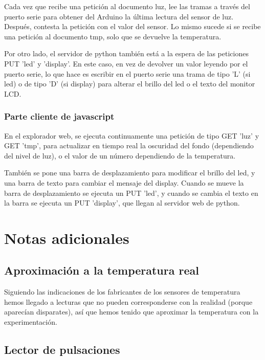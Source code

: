 \documentclass[]{article}
\begin{document}
Cada vez que recibe una petición al documento luz, lee las tramas a través del puerto serie para obtener del Arduino la última lectura del sensor de luz. Después, contesta la petición con el valor del sensor. Lo mismo sucede si se recibe una petición al documento tmp, solo que se devuelve la temperatura.

\hfill

Por otro lado, el servidor de python también está a la espera de las peticiones PUT 'led' y 'display'. En este caso, en vez de devolver un valor leyendo por el puerto serie, lo que hace es escribir en el puerto serie una trama de tipo 'L' (si led) o de tipo 'D' (si display) para alterar el brillo del led o el texto del monitor LCD.

\subsubsection{Parte cliente de javascript}

En el explorador web, se ejecuta continuamente una petición de tipo GET 'luz' y GET 'tmp', para actualizar en tiempo real la oscuridad del fondo (dependiendo del nivel de luz), o el valor de un número dependiendo de la temperatura.

\hfill

También se pone una barra de desplazamiento para modificar el brillo del led, y una barra de texto para cambiar el mensaje del display. Cuando se mueve la barra de desplazamiento se ejecuta un PUT 'led', y cuando se cambia el texto en la barra se ejecuta un PUT 'display', que llegan al servidor web de python.



\section{Notas adicionales}

\subsection{Aproximación a la temperatura real}
Siguiendo las indicaciones de los fabricantes de los sensores de temperatura hemos llegado a lecturas que no pueden corresponderse con la realidad (porque aparecían disparates), así que hemos tenido que aproximar la temperatura con la experimentación.


\subsection{Lector de pulsaciones}
\end{document}

